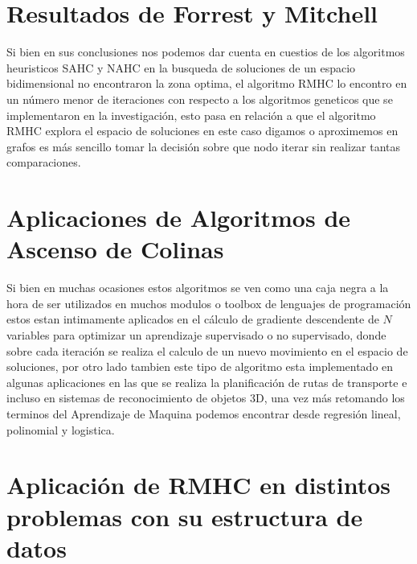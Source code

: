 \documentclass[10pt]{article}
\begin{document}
\section{Resultados de Forrest y Mitchell}
Si bien en sus conclusiones nos podemos dar cuenta en cuestios de los algoritmos heuristicos SAHC y NAHC en la busqueda de soluciones de un espacio bidimensional no encontraron la zona optima, el algoritmo RMHC lo encontro en un número menor de iteraciones con respecto a los algoritmos geneticos que se implementaron en la investigación, esto pasa en relación a que el algoritmo RMHC explora el espacio de soluciones en este caso digamos o aproximemos en grafos es más sencillo tomar la decisión sobre que nodo iterar sin realizar tantas comparaciones.
\section{Aplicaciones de Algoritmos de Ascenso de Colinas}
Si bien en muchas ocasiones estos algoritmos se ven como una caja negra a la hora de ser utilizados en muchos modulos o toolbox de lenguajes de programación estos estan intimamente aplicados en el cálculo de gradiente descendente de $N$ variables para optimizar un aprendizaje supervisado o no supervisado, donde sobre cada iteración se realiza el calculo de un nuevo movimiento en el espacio de soluciones, por otro lado tambien este tipo de algoritmo esta implementado en algunas aplicaciones en las que se realiza la planificación de rutas de transporte e incluso en sistemas de reconocimiento de objetos 3D, una vez más retomando los terminos del Aprendizaje de Maquina podemos encontrar desde regresión lineal, polinomial y logistica.
\section{Aplicación de RMHC en distintos problemas con su estructura de datos}
\end{document}
